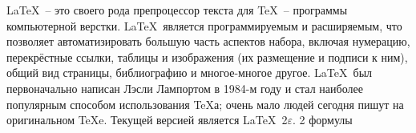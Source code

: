 \documentclass[a4paper, 12pt]{article} %
\begin{document}
\LaTeX \  -- это своего рода препроцессор текста для \TeX \ -- программы компьютерной верстки. \LaTeX \ является программируемым и расширяемым, что позволяет автоматизировать большую часть аспектов набора, включая нумерацию, перекрёстные ссылки, таблицы и изображения (их размещение и подписи к ним), общий вид страницы, библиографию и многое-многое другое. \LaTeX \ был первоначально написан Лэсли Лампортом в 1984-м году и стал наиболее популярным способом использования \TeX а; очень мало людей сегодня пишут на оригинальном \TeX e. Текущей версией является \LaTeX \ 2$\varepsilon$.
2 формулы
\end{document}
